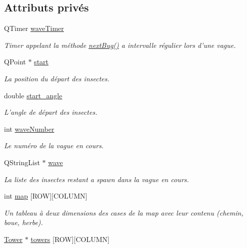 \subsection*{Attributs privés}
\begin{DoxyCompactItemize}
\item 
QTimer \hyperlink{classRender_a6351bb3de99ef093995785788c1d218e}{waveTimer}
\begin{DoxyCompactList}\small\item\em Timer appelant la méthode \hyperlink{classRender_a9413625fc472b4b7806f3a0d615d6ea9}{nextBug()} a intervalle régulier lors d'une vague. \end{DoxyCompactList}\item 
QPoint $\ast$ \hyperlink{classRender_afa2c3b6d106bf91639ddf351d7d3315e}{start}
\begin{DoxyCompactList}\small\item\em La position du départ des insectes. \end{DoxyCompactList}\item 
double \hyperlink{classRender_ab66f1b35519a6e9d6fe14e75a6973680}{start\_\-angle}
\begin{DoxyCompactList}\small\item\em L'angle de départ des insectes. \end{DoxyCompactList}\item 
int \hyperlink{classRender_a682e96907f3d52f710df4e9c2a5e9d07}{waveNumber}
\begin{DoxyCompactList}\small\item\em Le numéro de la vague en cours. \end{DoxyCompactList}\item 
QStringList $\ast$ \hyperlink{classRender_a6b5e2349a706152d4763d22b995e9237}{wave}
\begin{DoxyCompactList}\small\item\em La liste des insectes restant a spawn dans la vague en cours. \end{DoxyCompactList}\item 
int \hyperlink{classRender_a9c7793879c5007b8cae3a9c2885d283f}{map} \mbox{[}ROW\mbox{]}\mbox{[}COLUMN\mbox{]}
\begin{DoxyCompactList}\small\item\em Un tableau à deux dimensions des cases de la map avec leur contenu (chemin, boue, herbe). \end{DoxyCompactList}\item 
\hyperlink{classTower}{Tower} $\ast$ \hyperlink{classRender_a7b01b65692570fe6dec24d0a5c1aa178}{towers} \mbox{[}ROW\mbox{]}\mbox{[}COLUMN\mbox{]}

\end{DoxyCompactItemize}

